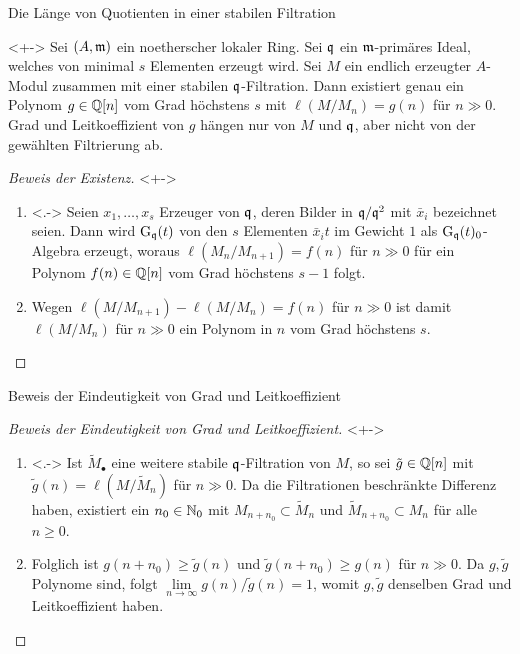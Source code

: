 \begin{frame}{Die Länge von Quotienten in einer stabilen Filtration}
	\begin{proposition}<+->
		Sei \((A, \mathfrak{m})\) ein noetherscher lokaler Ring. Sei \(\mathfrak{q}\) ein \(\mathfrak{m}\)-primäres Ideal, welches von
		minimal \(s\) Elementen erzeugt wird.
		Sei \(M\) ein endlich erzeugter \(A\)-Modul zusammen mit einer stabilen \(\mathfrak{q}\)-Filtration.
		Dann existiert genau ein Polynom \(g \in \mathbb Q[n]\) vom Grad höchstens \(s\)
		mit \(\ell(M/M_n) = g(n)\) für \(n \gg 0\). Grad und Leitkoeffizient von \(g\) hängen nur von \(M\) und \(\mathfrak{q}\), aber
		nicht von der gewählten Filtrierung ab.
	\end{proposition}
	\begin{proof}[Beweis der Existenz]<+->
		\begin{enumerate}[<+->]
		\item<.->
			Seien \(x_1, \dotsc, x_s\) Erzeuger von \(\mathfrak{q}\), deren Bilder in \(\mathfrak{q}/\mathfrak{q}^2\) mit \(\bar x_i\) bezeichnet
			seien. Dann wird \(\operatorname{G}_{\mathfrak{q}}(t)\) von den \(s\) Elementen \(\bar x_i t\) im Gewicht \(1\)
			als \(\operatorname{G}_{\mathfrak{q}}(t)_0\)-Algebra erzeugt, woraus \(\ell(M_n/M_{n + 1}) = f(n)\) für \(n \gg 0\) für ein
			Polynom \(f(n) \in \mathbb Q[n]\) vom Grad höchstens \(s - 1\) folgt.
		\item
			Wegen \(\ell(M/M_{n + 1}) - \ell(M/M_{n}) = f(n)\) für \(n \gg 0\) ist damit \(\ell(M/M_{n})\) für \(n \gg 0\)
			ein Polynom in \(n\) vom Grad höchstens \(s\).
			\renewcommand{\qedsymbol}{}
			\qedhere	
		\end{enumerate}
	\end{proof}
\end{frame}

\begin{frame}{Beweis der Eindeutigkeit von Grad und Leitkoeffizient}
	\begin{proof}[Beweis der Eindeutigkeit von Grad und Leitkoeffizient]<+->
		\begin{enumerate}[<+->]
		\item<.->
			Ist \(\tilde M_\bullet\) eine weitere stabile \(\mathfrak{q}\)-Filtration von \(M\), so sei \(\tilde g \in \mathbb Q[n]\) mit
			\(\tilde g(n) = \ell(M/\tilde M_n)\) für \(n \gg 0\). Da die Filtrationen beschränkte Differenz haben,
			existiert ein \(n_0 \in \mathbb N_0\) mit \(M_{n + n_0} \subset \tilde M_n\) und \(\tilde M_{n + n_0} \subset M_n\)
			für alle \(n \ge 0\).
		\item
			Folglich ist \(g(n + n_0) \ge \tilde g(n)\) und \(\tilde g(n + n_0) \ge g(n)\) für \(n \gg 0\). Da \(g, \tilde g\) Polynome
			sind, folgt \(\lim\limits_{n \to \infty} g(n)/\tilde g(n) = 1\), womit
			\(g, \tilde g\) denselben Grad und Leitkoeffizient haben.
			\qedhere
		\end{enumerate}
	\end{proof}
\end{frame}

